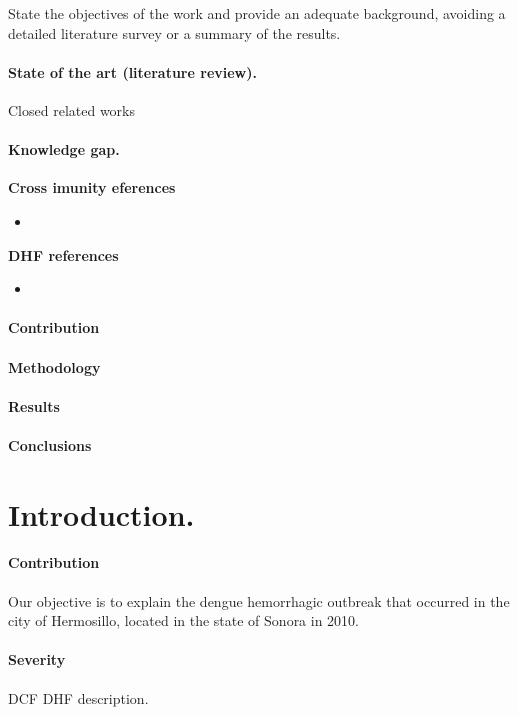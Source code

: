 State the objectives of the work and provide an adequate 
background, avoiding a detailed literature survey or a 
summary of the results.
\paragraph{State of the art (literature review).}
Closed related works


\paragraph{Knowledge gap.}
    \textbf{Cross imunity eferences}
    \begin{itemize}
        \item
            \cite{Garba2010}
    \end{itemize}
    \textbf{DHF references}
    \begin{itemize}
        \item
            \cite{Nuraini2007}
    \end{itemize}
\paragraph{Contribution}
\paragraph{Methodology}
\paragraph{Results}
\paragraph{Conclusions}


\section{Introduction.}\label{intro}
\paragraph{Contribution}
Our objective is to explain the dengue hemorrhagic outbreak that 
occurred in the city of Hermosillo, located in the state of Sonora in 2010.
\paragraph{Severity}
\ac{DCF} 
\ac{DHF} description.
